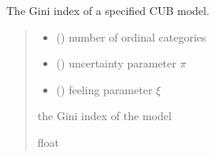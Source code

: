 \documentclass[letterpaper,10pt,english]{sphinxmanual}
\begin{document}

\begin{fulllineitems}
\label{\detokenize{cubmods:cubmods.cub.gini}}
\pysigstartsignatures
{}
\pysigstopsignatures
\sphinxAtStartPar
The Gini index of a specified CUB model.
\begin{quote}\begin{description}
\begin{itemize}
\item {} 
\sphinxAtStartPar
{} () \textendash{} number of ordinal categories

\item {} 
\sphinxAtStartPar
{} () \textendash{} uncertainty parameter \(\pi\)

\item {} 
\sphinxAtStartPar
{} () \textendash{} feeling parameter \(\xi\)

\end{itemize}

\sphinxAtStartPar
the Gini index of the model

\sphinxAtStartPar
float

\end{description}\end{quote}

\end{fulllineitems}

\end{document}

